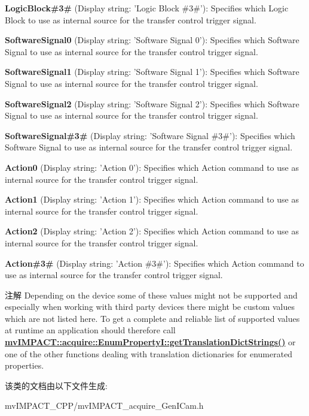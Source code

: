 \begin{DoxyItemize}
\item {\bfseries Logic\+Block\#3\#} (Display string\+: 'Logic Block \#3\#')\+: Specifies which Logic Block to use as internal source for the transfer control trigger signal.
\item {\bfseries Software\+Signal0} (Display string\+: 'Software Signal 0')\+: Specifies which Software Signal to use as internal source for the transfer control trigger signal.
\item {\bfseries Software\+Signal1} (Display string\+: 'Software Signal 1')\+: Specifies which Software Signal to use as internal source for the transfer control trigger signal.
\item {\bfseries Software\+Signal2} (Display string\+: 'Software Signal 2')\+: Specifies which Software Signal to use as internal source for the transfer control trigger signal.
\item {\bfseries Software\+Signal\#3\#} (Display string\+: 'Software Signal \#3\#')\+: Specifies which Software Signal to use as internal source for the transfer control trigger signal.
\item {\bfseries Action0} (Display string\+: 'Action 0')\+: Specifies which Action command to use as internal source for the transfer control trigger signal.
\item {\bfseries Action1} (Display string\+: 'Action 1')\+: Specifies which Action command to use as internal source for the transfer control trigger signal.
\item {\bfseries Action2} (Display string\+: 'Action 2')\+: Specifies which Action command to use as internal source for the transfer control trigger signal.
\item {\bfseries Action\#3\#} (Display string\+: 'Action \#3\#')\+: Specifies which Action command to use as internal source for the transfer control trigger signal.
\end{DoxyItemize}

\begin{DoxyNote}{注解}
Depending on the device some of these values might not be supported and especially when working with third party devices there might be custom values which are not listed here. To get a complete and reliable list of supported values at runtime an application should therefore call {\bfseries \hyperlink{classmv_i_m_p_a_c_t_1_1acquire_1_1_enum_property_i_a0ba6ccbf5ee69784d5d0b537924d26b6}{mv\+I\+M\+P\+A\+C\+T\+::acquire\+::\+Enum\+Property\+I\+::get\+Translation\+Dict\+Strings()}} or one of the other functions dealing with translation dictionaries for enumerated properties. 
\end{DoxyNote}


该类的文档由以下文件生成\+:\begin{DoxyCompactItemize}
\item 
mv\+I\+M\+P\+A\+C\+T\+\_\+\+C\+P\+P/mv\+I\+M\+P\+A\+C\+T\+\_\+acquire\+\_\+\+Gen\+I\+Cam.\+h\end{DoxyCompactItemize}
